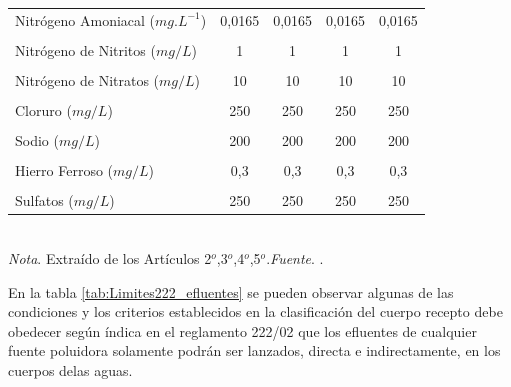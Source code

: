 \begin{table}[htpb]
\begin{tabular}{lcccc}
Nitrógeno Amoniacal ($mg.L^{-1}$)       & 0,0165    & 0,0165     & 0,0165     & 0,0165     \\
                                        &           &            &            &            \\
Nitrógeno de Nitritos ($mg/L$)          & 1         & 1          & 1          & 1          \\
                                        &           &            &            &            \\
Nitrógeno de Nitratos ($mg/L$)          & 10        & 10         & 10         & 10         \\
                                    &           &            &            &            \\ 
Cloruro ($mg /L$)                       & 250       & 250        & 250        & 250        \\
                                        &           &            &            &            \\
Sodio ($mg/L$)                          & 200       & 200        & 200        & 200        \\
                                        &           &            &            &            \\
Hierro Ferroso ($mg/L$)                 & 0,3       & 0,3        & 0,3        & 0,3        \\
                                        &           &            &            &            \\
Sulfatos ($mg/L$)                       & 250       & 250        & 250        & 250       \\
\bottomrule
\end{tabular}
\\
\bigskip
\small \textit{Nota}. Extra\'ido de los Art\'iculos 2$^{o}$,3$^{o}$,4$^{o}$,5$^{o}$.\textit{Fuente}. \cite{la-secretaria-del-ambiente-2002}.
\end{table}

En la tabla \ref{tab:Limites222_efluentes} se pueden observar algunas de las  condiciones y los criterios establecidos en la clasificaci\'on del cuerpo recepto debe obedecer seg\'un \'indica en el reglamento 222/02 que los efluentes de cualquier fuente poluidora solamente podr\'an ser lanzados, directa e indirectamente, en los cuerpos delas aguas.


